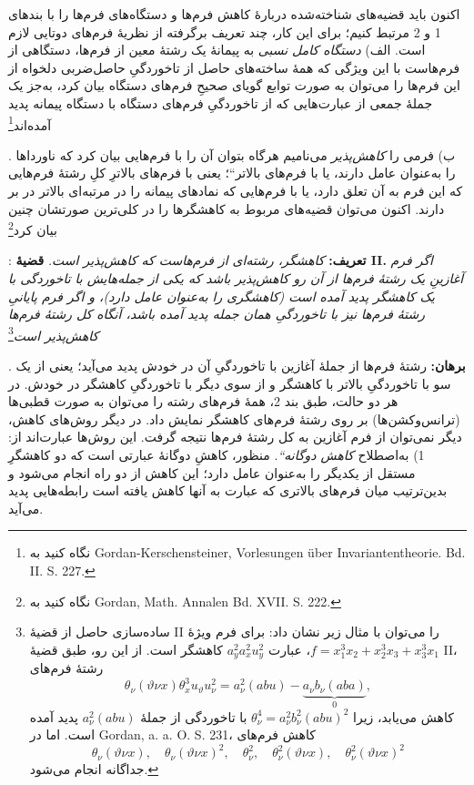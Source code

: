 \documentclass[11pt]{article}
\providecommand{\glqq}{\textquotedblbase}
\providecommand{\grqq}{\textquotedblleft}
\newcommand{\srcLTR}[1]{\relax\ifmmode\text{\mbox{\babelsublr{\foreignlanguage{english}{#1}}}}\else\babelsublr{\foreignlanguage{english}{#1}}\fi}
\newcommand{\srcfn}[2]{\begingroup\renewcommand{\thefootnote}{\srcLTR{#1}}\footnote{#2}\addtocounter{footnote}{-1}\endgroup}
\begin{document}
اکنون باید قضیه‌های شناخته‌شده دربارهٔ کاهش فرم‌ها و دستگاه‌های فرم‌ها را با بندهای 1 و 2 مرتبط کنیم؛ برای این کار، چند تعریف برگرفته از نظریهٔ فرم‌های دوتایی لازم است.
الف) \emph{دستگاه کامل نسبی} به پیمانهٔ یک رشتهٔ معین از فرم‌ها، دستگاهی از فرم‌هاست با این ویژگی که همهٔ ساخته‌های حاصل از تاخوردگیِ حاصل‌ضربی دلخواه از این فرم‌ها را می‌توان به صورت توابع گویای صحیحِ فرم‌های دستگاه بیان کرد، به‌جز یک جملهٔ جمعی از عبارت‌هایی که از تاخوردگیِ فرم‌های دستگاه با دستگاه پیمانه پدید آمده‌اند\srcfn{*)}{نگاه کنید به Gordan-Kerschensteiner, Vorlesungen über Invariantentheorie. Bd. II. S. 227.}.
ب) فرمی را \emph{کاهش‌پذیر} می‌نامیم هرگاه بتوان آن را با فرم‌هایی بیان کرد که ناورداها را به‌عنوان عامل دارند، یا با \glqq{}فرم‌های بالاتر\grqq{}؛ یعنی با فرم‌های بالاترِ کلِ رشتهٔ فرم‌هایی که این فرم به آن تعلق دارد، یا با فرم‌هایی که نمادهای پیمانه را در مرتبه‌ای بالاتر در بر دارند.
اکنون می‌توان قضیه‌های مربوط به کاهشگرها را در کلی‌ترین صورتشان چنین بیان کرد\srcfn{**)}{نگاه کنید به Gordan, Math. Annalen Bd. XVII. S. 222.}:
\textbf{تعریف:} \emph{کاهشگر، رشته‌ای از فرم‌هاست که کاهش‌پذیر است.}
\textbf{قضیهٔ II.} \emph{اگر فرم آغازینِ یک رشتهٔ فرم‌ها از آن رو کاهش‌پذیر باشد که یکی از جمله‌هایش با تاخوردگی با یک کاهشگر پدید آمده است (کاهشگری را به‌عنوان عامل دارد)، و اگر فرم پایانیِ رشتهٔ فرم‌ها نیز با تاخوردگیِ همان جمله پدید آمده باشد، آنگاه کل رشتهٔ فرم‌ها کاهش‌پذیر است}\srcfn{*)}{ساده‌سازی حاصل از قضیهٔ II را می‌توان با مثال زیر نشان داد: برای فرم ویژهٔ $f=x_1^3x_2+x_2^3x_3+x_3^3x_1$، عبارت $a_y^2a_x^2u_y^2$ کاهشگر است. از این رو، طبق قضیهٔ II، رشتهٔ فرم‌های
\[
\theta_\nu(\vartheta\nu x)\theta_x^3u_\vartheta u_\nu^2
=
a_\nu^2(abu)-\underbrace{a_\nu b_\nu(aba)}_{0},
\]
کاهش می‌یابد، زیرا $\theta_\nu^4=a_\nu^2b_\nu^2(abu)^2$ با تاخوردگی از جملهٔ $a_\nu^2(abu)$ پدید آمده است. اما در Gordan, a. a. O. S. 231، کاهش فرم‌های
\[
\theta_\nu(\vartheta\nu x),\quad \theta_\nu(\vartheta\nu x)^2,\quad
\theta_\nu^2,\quad \theta_\nu^2(\vartheta\nu x),\quad
\theta_\nu^2(\vartheta\nu x)^2
\]
جداگانه انجام می‌شود.}.
\textbf{برهان:} رشتهٔ فرم‌ها از جملهٔ آغازین با تاخوردگیِ آن در خودش پدید می‌آید؛ یعنی از یک سو با تاخوردگیِ بالاتر با کاهشگر و از سوی دیگر با تاخوردگیِ کاهشگر در خودش. در هر دو حالت، طبق بند 2، همهٔ فرم‌های رشته را می‌توان به صورت قطبی‌ها (ترانس‌وکشن‌ها) بر روی رشتهٔ فرم‌های کاهشگر نمایش داد.
در دیگر روش‌های کاهش، دیگر نمی‌توان از فرم آغازین به کل رشتهٔ فرم‌ها نتیجه گرفت. این روش‌ها عبارت‌اند از:
1) به‌اصطلاح \emph{\glqq{}کاهش دوگانه\grqq{}}.
منظور، کاهشِ دوگانهٔ عبارتی است که دو کاهشگرِ مستقل از یکدیگر را به‌عنوان عامل دارد؛ این کاهش از دو راه انجام می‌شود و بدین‌ترتیب میان فرم‌های بالاتری که عبارت به آنها کاهش یافته است رابطه‌هایی پدید می‌آید.
\end{document}
